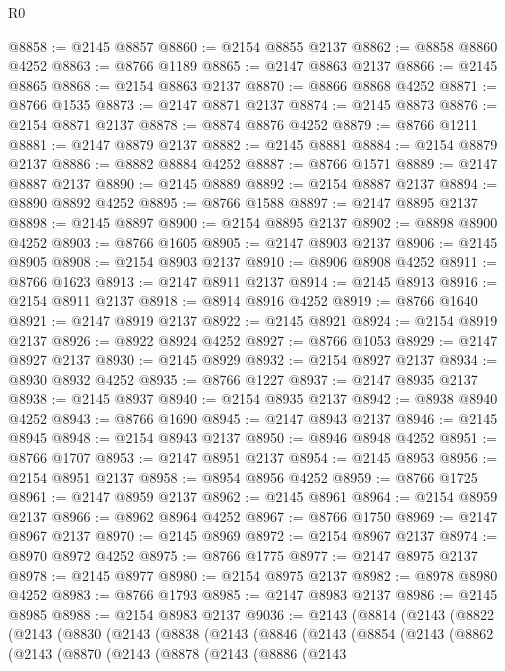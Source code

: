 \begin{lexlean}{R0}
\begin{coremodule}
@8858 := @2145 @8857
@8860 := @2154 @8855 @2137
@8862 := @8858 @8860 @4252
@8863 := @8766 @1189
@8865 := @2147 @8863 @2137
@8866 := @2145 @8865
@8868 := @2154 @8863 @2137
@8870 := @8866 @8868 @4252
@8871 := @8766 @1535
@8873 := @2147 @8871 @2137
@8874 := @2145 @8873
@8876 := @2154 @8871 @2137
@8878 := @8874 @8876 @4252
@8879 := @8766 @1211
@8881 := @2147 @8879 @2137
@8882 := @2145 @8881
@8884 := @2154 @8879 @2137
@8886 := @8882 @8884 @4252
@8887 := @8766 @1571
@8889 := @2147 @8887 @2137
@8890 := @2145 @8889
@8892 := @2154 @8887 @2137
@8894 := @8890 @8892 @4252
@8895 := @8766 @1588
@8897 := @2147 @8895 @2137
@8898 := @2145 @8897
@8900 := @2154 @8895 @2137
@8902 := @8898 @8900 @4252
@8903 := @8766 @1605
@8905 := @2147 @8903 @2137
@8906 := @2145 @8905
@8908 := @2154 @8903 @2137
@8910 := @8906 @8908 @4252
@8911 := @8766 @1623
@8913 := @2147 @8911 @2137
@8914 := @2145 @8913
@8916 := @2154 @8911 @2137
@8918 := @8914 @8916 @4252
@8919 := @8766 @1640
@8921 := @2147 @8919 @2137
@8922 := @2145 @8921
@8924 := @2154 @8919 @2137
@8926 := @8922 @8924 @4252
@8927 := @8766 @1053
@8929 := @2147 @8927 @2137
@8930 := @2145 @8929
@8932 := @2154 @8927 @2137
@8934 := @8930 @8932 @4252
@8935 := @8766 @1227
@8937 := @2147 @8935 @2137
@8938 := @2145 @8937
@8940 := @2154 @8935 @2137
@8942 := @8938 @8940 @4252
@8943 := @8766 @1690
@8945 := @2147 @8943 @2137
@8946 := @2145 @8945
@8948 := @2154 @8943 @2137
@8950 := @8946 @8948 @4252
@8951 := @8766 @1707
@8953 := @2147 @8951 @2137
@8954 := @2145 @8953
@8956 := @2154 @8951 @2137
@8958 := @8954 @8956 @4252
@8959 := @8766 @1725
@8961 := @2147 @8959 @2137
@8962 := @2145 @8961
@8964 := @2154 @8959 @2137
@8966 := @8962 @8964 @4252
@8967 := @8766 @1750
@8969 := @2147 @8967 @2137
@8970 := @2145 @8969
@8972 := @2154 @8967 @2137
@8974 := @8970 @8972 @4252
@8975 := @8766 @1775
@8977 := @2147 @8975 @2137
@8978 := @2145 @8977
@8980 := @2154 @8975 @2137
@8982 := @8978 @8980 @4252
@8983 := @8766 @1793
@8985 := @2147 @8983 @2137
@8986 := @2145 @8985
@8988 := @2154 @8983 @2137
@9036 := @2143
    (@8814
      (@2143
        (@8822
          (@2143
            (@8830
              (@2143
                (@8838
                  (@2143
                    (@8846
                      (@2143
                        (@8854
                          (@2143
                            (@8862
                              (@2143
                                (@8870
                                  (@2143
                                    (@8878
                                      (@2143
                                        (@8886
                                          (@2143

\end{coremodule}
\end{lexlean}
